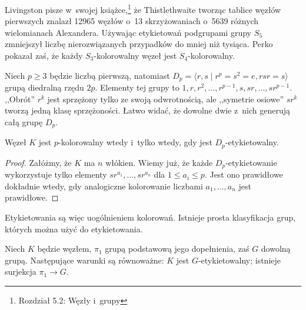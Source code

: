 Livingston pisze w~swojej książce,\footnote{Rozdział 5.2: Węzły i~grupy} że Thistlethwaite tworząc tablice węzłów pierwszych znalazł 12965 węzłów o~13 skrzyżowaniach o~5639 różnych wielomianach Alexandera.
Używając etykietowań podgrupami grupy $S_5$ zmniejszył liczbę nierozwiązanych przypadków do mniej niż tysiąca.
Perko pokazał zaś, że każdy $S_3$-kolorowalny węzeł jest $S_4$-kolorowalny.

Niech $p \ge 3$ będzie liczbą pierwszą, natomiast $D_p = \langle r, s \mid r^p = s^2 = e, rsr = s \rangle$ grupą diedralną rzędu $2p$.
Elementy tej grupy to $1, r, r^2, \ldots, r^{p-1}, s, sr, \ldots, sr^{p-1}$.
,,Obrót'' $r^k$ jest sprzężony tylko ze swoją odwrotnością, ale ,,symetrie osiowe'' $sr^k$ tworzą jedną klasę sprzężoności.
Łatwo widać, że dowolne dwie z~nich generują całą grupę $D_p$.

\begin{proposition}
    Węzeł $K$ jest $p$-kolorowalny wtedy i~tylko wtedy, gdy jest $D_p$-etykietowalny.
\end{proposition}

\begin{proof}
    Załóżmy, że $K$ ma $n$ włókien.
    Wiemy już, że każde $D_p$-etykietowanie wykorzystuje tylko elementy $sr^{a_1}, \ldots, sr^{a_n}$ dla $1 \le a_i \le p$.
    Jest ono prawidłowe dokładnie wtedy, gdy analogiczne kolorowanie liczbami $a_1, \ldots, a_n$ jest prawidłowe.
\end{proof}

Etykietowania są więc uogólnieniem kolorowań.
Istnieje prosta klasyfikacja grup, których można użyć do etykietowania.

\begin{proposition}
    Niech $K$ będzie węzłem, $\pi_1$ grupą podstawową jego dopełnienia, zaś $G$ dowolną grupą.
    Następujące warunki są równoważne: $K$ jest $G$-etykietowalny; istnieje surjekcja $\pi_1 \to G$.
\end{proposition}



